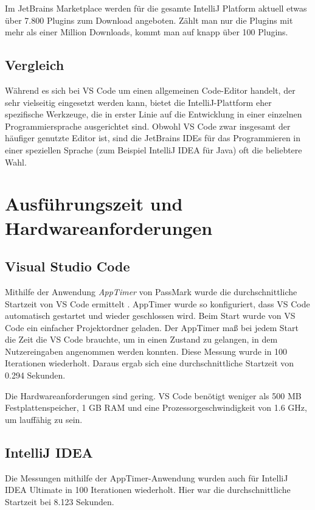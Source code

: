 Im JetBrains Marketplace werden für die gesamte IntelliJ Platform aktuell
etwas über 7.800 Plugins zum Download angeboten. Zählt man nur die 
Plugins mit mehr als einer Million Downloads, kommt man auf
knapp über 100 Plugins.

\subsection{Vergleich}

Während es sich bei VS Code um einen allgemeinen Code-Editor handelt,
der sehr vielseitig eingesetzt werden kann, bietet die IntelliJ-Plattform
eher spezifische Werkzeuge, die in erster Linie auf die Entwicklung in
einer einzelnen Programmiersprache ausgerichtet sind.
Obwohl VS Code zwar insgesamt der häufiger genutzte Editor ist,
sind die JetBrains IDEs für das Programmieren in einer 
speziellen Sprache (zum Beispiel IntelliJ IDEA für Java) oft die
beliebtere Wahl.
    

\section{Ausführungszeit und Hardwareanforderungen}
\label{sec:Vergleich_Performance}

\subsection{Visual Studio Code}

Mithilfe der Anwendung \emph{AppTimer} von PassMark wurde
die durchschnittliche Startzeit von VS Code ermittelt \cite{PassMarkAppTimer}.
AppTimer wurde so konfiguriert, dass VS Code automatisch gestartet
und wieder geschlossen wird. Beim Start wurde von VS Code ein
einfacher Projektordner geladen. Der AppTimer maß bei jedem Start
die Zeit die VS Code brauchte, um in einen Zustand zu gelangen,
in dem Nutzereingaben angenommen werden konnten.
Diese Messung wurde in 100 Iterationen wiederholt.
Daraus ergab sich eine durchschnittliche Startzeit von 0.294 Sekunden.

Die Hardwareanforderungen sind gering. VS Code benötigt weniger
als 500 MB Festplattenspeicher, 1 GB RAM und eine Prozessorgeschwindigkeit
von 1.6 GHz, um lauffähig zu sein.

\subsection{IntelliJ IDEA}

Die Messungen mithilfe der AppTimer-Anwendung wurden auch
für IntelliJ IDEA Ultimate in 100 Iterationen wiederholt.
Hier war die durchschnittliche Startzeit bei 8.123 Sekunden.

